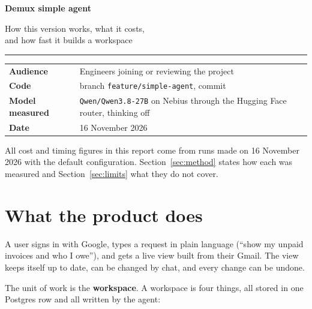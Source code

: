 \documentclass[10pt,a4paper]{article}
\newcommand{\code}[1]{\texttt{\small #1}}
\begin{document}
\begin{titlepage}
\vspace*{3.2cm}
{\sffamily\bfseries\fontsize{26}{30}\selectfont Demux simple agent\par}
\vspace{4mm}
{\sffamily\Large\color{ink2} How this version works, what it costs,\\ and how fast it builds a workspace\par}
\vspace{1.2cm}
{\color{rule}\rule{\linewidth}{0.6pt}}
\vspace{6mm}

\begin{tabularx}{\linewidth}{@{}P{3.4cm}L@{}}
\textbf{Audience} & Engineers joining or reviewing the project \\
\textbf{Code} & branch \code{feature/simple-agent}, commit \code{\Ncommit} \\
\textbf{Model measured} & \code{Qwen/Qwen3.8-27B} on Nebius through the Hugging Face router, thinking off \\
\textbf{Date} & 16 November 2026 \\
\end{tabularx}

\vfill

\vfill
{\small\color{ink2}All cost and timing figures in this report come from runs made on 16 November 2026
with the default configuration. Section~\ref{sec:method} states how each was measured and
Section~\ref{sec:limits} what they do not cover.}
\end{titlepage}

\tableofcontents
\newpage

\section{What the product does}

A user signs in with Google, types a request in plain language (``show my unpaid invoices and
who I owe''), and gets a live view built from their Gmail. The view keeps itself up to date,
can be changed by chat, and every change can be undone.

The unit of work is the \textbf{workspace}. A workspace is four things, all stored in one
Postgres row and all written by the agent:
\end{document}
